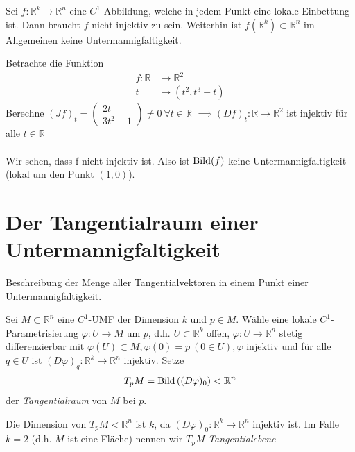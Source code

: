 \documentclass[../main.tex]{subfiles}
\begin{document}
\begin{remark}
Sei $f: \mathbb{R}^k \to \mathbb{R}^n$ eine $C^1$-Abbildung, welche in jedem Punkt eine lokale Einbettung ist.
Dann braucht $f$ nicht injektiv zu sein. Weiterhin ist $f(\mathbb{R}^k) \subset \mathbb{R}^n$ im Allgemeinen keine Untermannigfaltigkeit.
\end{remark}
\begin{example}
Betrachte die Funktion
\begin{align*}
    f \colon \mathbb{R} & \to \mathbb{R}^2 \\
    t & \mapsto (t^2,t^3-t)
\end{align*}
Berechne $(Jf)_t = \begin{pmatrix}2t \\ 3t^2 -1\end{pmatrix} \not  = 0 \ \forall t \in \mathbb{R}$
$\implies (Df)_t : \mathbb{R} \to \mathbb{R}^2$ ist injektiv für alle $t \in \mathbb{R}$
\\ \\
Wir sehen, dass f nicht injektiv ist. Also ist $\operatorname{Bild} (f)$ keine Untermannigfaltigkeit (lokal um den Punkt $(1,0)$).
\end{example}

\section{Der Tangentialraum einer Untermannigfaltigkeit}

\begin{goal}
Beschreibung der Menge aller Tangentialvektoren in einem Punkt einer Untermannigfaltigkeit.
\end{goal}

\begin{definition}
Sei $M \subset \mathbb{R}^n$ eine $C^1$-UMF der Dimension $k$ und $p \in M$. Wähle eine lokale $C^1$-Parametrisierung $\varphi : U \to M$ um $p$, d.h. $U \subset \mathbb{R}^k$ offen, $\varphi : U \to
\mathbb{R}^n$ stetig differenzierbar mit $\varphi(U) \subset M, \varphi (0)=p \ (0 \in U), \varphi$ injektiv und für alle $q\in U$ ist $(D\varphi)_q : \mathbb{R}^k \to \mathbb{R}^n $ injektiv. Setze
\begin{align*}
    T_pM = \operatorname{Bild}\left((D\varphi)_0\right) < \mathbb{R}^n
\end{align*} der \emph{Tangentialraum} von $M$ bei $p$.
\end{definition}

\begin{remark}
Die Dimension von $T_pM < \mathbb{R}^n$ ist $k$, da $(D\varphi)_0 : \mathbb{R}^k \to \mathbb{R}^n$ injektiv ist. Im Falle $k=2$ (d.h. $M$ ist eine Fläche) nennen wir $T_pM$ \emph{Tangentialebene} 
\end{remark}
\end{document}
